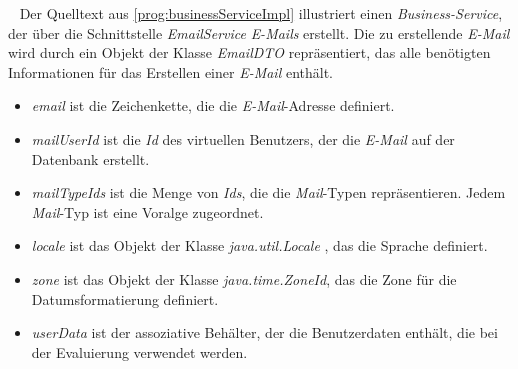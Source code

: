 \ \newline
Der Quelltext aus \ref{prog:businessServiceImpl} illustriert einen \emph{Business-Service}, der über die Schnittstelle \emph{EmailService} \emph{E-Mails} erstellt. Die zu erstellende \emph{E-Mail} wird durch ein Objekt der Klasse \emph{EmailDTO} repräsentiert, das alle benötigten Informationen für das Erstellen einer \emph{E-Mail} enthält.
\begin{itemize}
	\item\emph{email} ist die Zeichenkette, die die \emph{E-Mail}-Adresse definiert.
	\item\emph{mailUserId} ist die \emph{Id} des virtuellen Benutzers, der die \emph{E-Mail} auf der Datenbank erstellt.
	\item\emph{mailTypeIds} ist die Menge von \emph{Ids}, die die \emph{Mail}-Typen repräsentieren. Jedem \emph{Mail}-Typ ist eine Voralge zugeordnet.
	\item\emph{locale} ist das Objekt der Klasse \emph{java.util.Locale} , das die Sprache definiert.
	\item\emph{zone} ist das Objekt der Klasse \emph{java.time.ZoneId}, das die Zone für die Datumsformatierung definiert.
	\item\emph{userData} ist der assoziative Behälter, der die Benutzerdaten enthält, die bei der Evaluierung verwendet werden.
\end{itemize}

